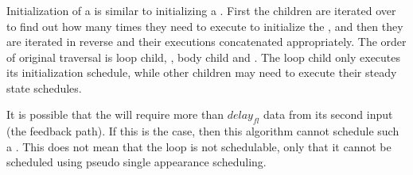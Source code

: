 \subsubsection{{\feedbackloops}}
\label{sec:sas-fl}

 Initialization of a
{\feedbackloop} is similar to initializing a {\pipeline}. First
the children are iterated over to find out how many times they
need to execute to initialize the {\feedbackloop}, and then they
are iterated in reverse and their executions concatenated
appropriately. The order of original traversal is loop child,
{\splitter}, body child and {\joiner}. The loop child only
executes its initialization schedule, while other children may
need to execute their steady state schedules.

It is possible that the {\joiner} will require more than
$delay_{fl}$ data from its second input (the feedback path). If
this is the case, then this algorithm cannot schedule such a
{\feedbackloop}. This does not mean that the loop is not
schedulable, only that it cannot be scheduled using pseudo single
appearance scheduling.

